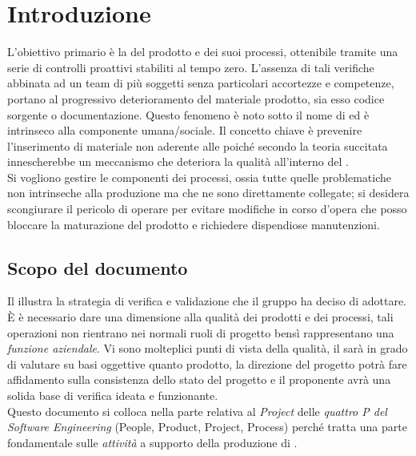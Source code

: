 \section{Introduzione}
 L'obiettivo primario è la  del prodotto e dei suoi processi, ottenibile tramite una serie di controlli proattivi stabiliti al tempo zero. L'assenza di tali verifiche abbinata ad un team di più soggetti senza particolari accortezze e competenze, portano al progressivo deterioramento del materiale prodotto, sia esso codice sorgente o documentazione. Questo fenomeno è noto sotto il nome di  ed è intrinseco alla componente umana/sociale. Il concetto chiave è prevenire l'inserimento di materiale non aderente alle \NormeDiProgetto poiché secondo la teoria succitata innescherebbe un meccanismo che deteriora la qualità all'interno del . \\ %
Si vogliono gestire le componenti  dei processi, ossia tutte quelle problematiche non intrinseche alla produzione ma che ne sono direttamente collegate; si desidera scongiurare il pericolo di operare  per evitare modifiche in corso d'opera che posso bloccare la  maturazione del prodotto e richiedere dispendiose manutenzioni.

\subsection{Scopo del documento}
Il \DocTitle  illustra la strategia di verifica e validazione che il gruppo \GroupName ha deciso di adottare. È è necessario dare una dimensione alla qualità dei prodotti e dei processi, tali operazioni non rientrano nei normali ruoli di progetto bensì rappresentano una \emph{funzione aziendale}. Vi sono molteplici punti di vista della qualità, il  sarà in grado di valutare su basi oggettive quanto prodotto, la direzione del progetto potrà fare affidamento sulla consistenza dello stato del progetto e il proponente avrà una solida base di verifica ideata e funzionante. \\ Questo documento si colloca nella parte relativa al \emph{Project} delle \emph{quattro P del Software Engineering} (People, Product, Project, Process) perché tratta una parte fondamentale sulle \emph{attività} a supporto della produzione di \ProjectName.

